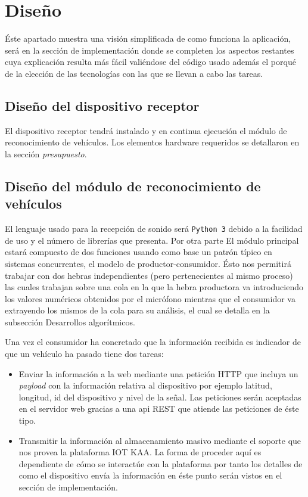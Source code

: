 \chapter{Diseño}

Éste apartado muestra una visión simplificada de como funciona la aplicación, será en la sección de implementación donde se completen los aspectos restantes cuya explicación resulta más fácil valiéndose del código usado además el porqué de la elección de las tecnologías con las que se llevan a cabo las tareas.

\section{Diseño del dispositivo receptor}

El dispositivo receptor tendrá instalado y en continua ejecución el módulo de reconocimiento de vehículos. Los elementos hardware requeridos se detallaron en la sección \textit{presupuesto}.

\section{Diseño del módulo de reconocimiento de vehículos}
El lenguaje usado para la recepción de sonido será {\tt Python 3} debido a la facilidad de uso y el número de librerías que presenta. Por otra parte
El módulo principal estará compuesto de dos funciones usando como base un patrón típico en sistemas concurrentes, el  modelo de productor-consumidor. Ésto nos permitirá trabajar con dos hebras independientes (pero pertenecientes al mismo proceso) las cuales trabajan sobre una cola en la que la hebra productora va introduciendo los valores numéricos obtenidos por el micrófono mientras que el consumidor va extrayendo los mismos de la cola para su análisis, el cual se detalla en la subsección Desarrollos algorítmicos.

Una vez el consumidor ha concretado que la información recibida es indicador de que un vehículo ha pasado tiene dos tareas:

\begin{itemize}
  \item Enviar la información a la web mediante una petición HTTP que incluya un \textit{payload} con la información relativa al dispositivo por ejemplo latitud, longitud, id del dispositivo y nivel de la señal. Las peticiones serán aceptadas en el servidor web gracias a una api REST que atiende las peticiones de éste tipo.
  \item Transmitir la información al almacenamiento masivo mediante el soporte que nos provea la plataforma IOT KAA. La forma de proceder aquí es dependiente de cómo se interactúe con la plataforma por tanto los detalles de como el dispositivo envía la información en éste punto serán vistos en el sección de implementación.
\end{itemize}

